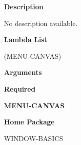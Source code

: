  
{\bf Description}

No description available.

 
{\bf Lambda List}

(MENU-CANVAS)

 
{\bf Arguments}


\beginhang
{\bf Required}\hspace{2em}
 
{\bf MENU-CANVAS}


 
\endhang
 
{\bf Home Package}

WINDOW-BASICS

